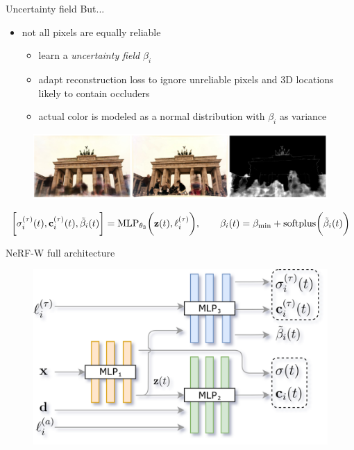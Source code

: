 \documentclass[aspectratio=1610]{beamer}
\newcommand{\parenth}[2][]{#1(#2#1)}
\begin{document}
\begin{frame}{Uncertainty field}
    But... 
    \pause
    \begin{itemize}
        \item not all pixels are equally reliable
        \begin{itemize}
            \item learn a \emph{uncertainty field} \(\beta_i\)
            \item adapt reconstruction loss to ignore unreliable pixels and 3D locations likely to contain occluders
            \item actual color is modeled as a normal distribution with \(\beta_i\) as variance
        \end{itemize}
    \end{itemize}
    \bigskip
    \pause
    \begin{figure}[H]
        \centering
        \includegraphics[width=.75\textwidth]{uncertainty.png}
    \end{figure}
    \bigskip
    \pause
    \begin{equation*}
        \bigg[\sigma_i^{(\tau)} (t), \vb{c}_i^{(\tau)} (t), \tilde{\beta}_i (t)\bigg] = \textrm{MLP}_{\theta_3} \parenth[\bigg]{\vb{z}(t), \ell_i^{(\tau)}},
        \quad\quad 
        \beta_i (t) = \beta_{\textrm{min}} + \textrm{softplus}\parenth[\bigg]{\tilde{\beta}_i (t)}
    \end{equation*}
\end{frame}

\begin{frame}{NeRF-W full architecture}
    \begin{figure}[H]
        \centering
        \includegraphics[width=.8\textwidth,keepaspectratio]{nerfw-architecture.png}
    \end{figure}
\end{frame}
\end{document}
